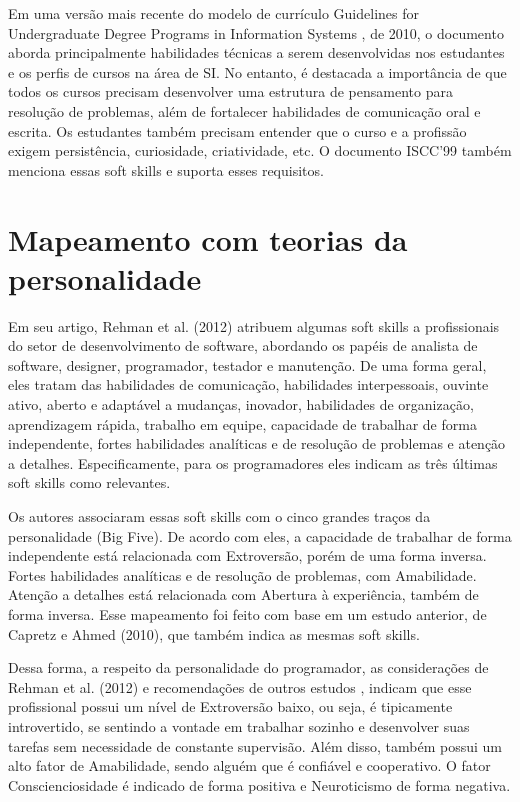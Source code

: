 Em uma versão mais recente do modelo de currículo Guidelines for Undergraduate Degree Programs in Information Systems \cite{is10}, de 2010, o documento aborda principalmente habilidades técnicas a serem desenvolvidas nos estudantes e os perfis de cursos na área de SI. No entanto, é destacada a importância de que todos os cursos precisam desenvolver uma estrutura de pensamento para resolução de problemas, além de fortalecer habilidades de comunicação oral e escrita. Os estudantes também precisam entender que o curso e a profissão exigem persistência, curiosidade, criatividade, etc. O documento ISCC'99 também menciona essas soft skills e suporta esses requisitos.

\section{Mapeamento com teorias da personalidade}
\label{sec:mapeamento}

Em seu artigo, Rehman et al. (2012)\nocite{rehman:12} atribuem algumas soft skills a profissionais do setor de desenvolvimento de software, abordando os papéis de analista de software, designer, programador, testador e manutenção. De uma forma geral, eles tratam das habilidades de comunicação, habilidades interpessoais, ouvinte ativo, aberto e adaptável a mudanças, inovador, habilidades de organização, aprendizagem rápida, trabalho em equipe, capacidade de trabalhar de forma independente, fortes habilidades analíticas e de resolução de problemas e atenção a detalhes. Especificamente, para os programadores eles indicam as três últimas soft skills como relevantes.

Os autores associaram essas soft skills com o cinco grandes traços da personalidade (Big Five). De acordo com eles, a capacidade de trabalhar de forma independente está relacionada com Extroversão, porém de uma forma inversa. Fortes habilidades analíticas e de resolução de problemas, com Amabilidade. Atenção a detalhes está relacionada com Abertura à experiência, também de forma inversa. Esse mapeamento foi feito com base em um estudo anterior, de Capretz e Ahmed (2010)\nocite{capretz:10}, que também indica as mesmas soft skills.

Dessa forma, a respeito da personalidade do programador, as considerações de Rehman et al. (2012)\nocite{rehman:12} e recomendações de outros estudos \cite{sodiya:07, martinez:11}, indicam que esse profissional possui um nível de Extroversão baixo, ou seja, é tipicamente introvertido, se sentindo a vontade em trabalhar sozinho e desenvolver suas tarefas sem necessidade de constante supervisão. Além disso, também possui um alto fator de Amabilidade, sendo alguém que é confiável e cooperativo. O fator Conscienciosidade é indicado de forma positiva e Neuroticismo de forma negativa.

